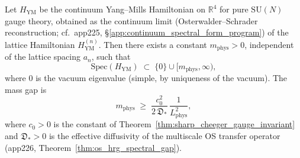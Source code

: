 \begin{theorem}
\label{thm:clay_mass_gap_app229}
Let $H_{\mathrm{YM}}$ be the continuum Yang--Mills Hamiltonian
on $\mathbb{R}^{4}$ for pure $\mathrm{SU}(N)$ gauge theory,
obtained as the continuum limit (Osterwalder--Schrader
reconstruction; cf.\ app225, \S\ref{app:continuum_spectral_form_program})
of the lattice Hamiltonian $H_{\mathrm{YM}}^{(n)}$. Then there
exists a constant $m_{\mathrm{phys}}>0$, independent of the
lattice spacing $a_{n}$, such that
\begin{equation}
\label{eq:clay_mass_gap_app229}
  \mathrm{Spec}(H_{\mathrm{YM}})\;\subset\;\{0\}\cup
  [m_{\mathrm{phys}},\infty),
\end{equation}
where $0$ is the vacuum eigenvalue (simple, by uniqueness of
the vacuum). The mass gap is
\begin{equation}
\label{eq:mass_gap_value_app229}
  m_{\mathrm{phys}}
  \;\ge\;\frac{c_{0}^{2}}{2\,\mathfrak{D}_{*}}\,
  \frac{1}{L_{\mathrm{phys}}^{2}},
\end{equation}
where $c_{0}>0$ is the constant of
Theorem~\ref{thm:sharp_cheeger_gauge_invariant} and
$\mathfrak{D}_{*}>0$ is the effective diffusivity of the
multiscale OS transfer operator (app226,
Theorem~\ref{thm:os_hrg_spectral_gap}).
\end{theorem}

